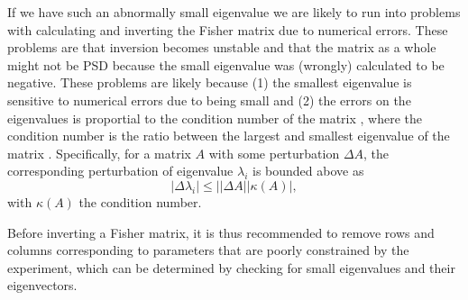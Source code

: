 \documentclass[11pt]{article} %
\DeclareRobustCommand{\Cov}{\ifmmode\text{Cov}\else d\fi}
\begin{document}
If we have such an abnormally small eigenvalue we are likely to run into problems with calculating and inverting the Fisher matrix due to numerical errors. These problems are that inversion becomes unstable and that the matrix as a whole might not be PSD because the small eigenvalue was (wrongly) calculated to be negative. These problems are likely because (1) the smallest eigenvalue is sensitive to numerical errors due to being small and (2) the errors on the eigenvalues is proportial to the condition number of the matrix \cite{horn2012matrix}, where the condition number is the ratio between the largest and smallest eigenvalue of the matrix \cite{trefethen1997numerical}. Specifically, for a matrix $A$ with some perturbation $\Delta A$, the corresponding  perturbation of eigenvalue $\lambda_i$ is bounded above as
\begin{equation*}
    |\Delta \lambda_i | \leq ||\Delta A || \kappa(A)|,
\end{equation*}
with $\kappa(A)$ the condition number. 

Before inverting a Fisher matrix, it is thus recommended to remove rows and columns corresponding to parameters that are poorly constrained by the experiment, which can be determined by checking for small eigenvalues and their eigenvectors.



\end{document}
